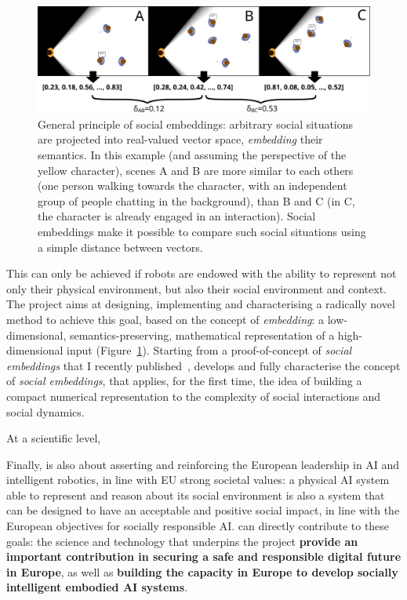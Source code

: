 \begin{figure}[H]
    \centering
    \includegraphics[width=0.9\linewidth]{figs/social-embeddings}
    \caption{General principle of social embeddings: arbitrary social situations
    are projected into real-valued vector space, \emph{embedding} their
    semantics. In this example (and assuming the perspective of the yellow
    character), scenes A and B  are more similar to each others (one person walking towards the
    character, with an independent group of people chatting in the background),
    than B and C (in C, the character is already engaged in an interaction).
    Social embeddings make it possible to compare such social situations using
    a simple distance between vectors.}
    \label{fig:social-embeddings}
\end{figure}

This can only be achieved if robots are endowed with the ability to represent
not only their physical environment, but also their social environment and
context. The \project project aims at designing, implementing and characterising
a radically novel method to achieve this goal, based on the concept of
\emph{embedding}: a low-dimensional, semantics-preserving, mathematical
representation of a high-dimensional input (Figure~\ref{fig:social-embeddings}).
Starting from a proof-of-concept of \emph{social embeddings} that I recently
published~\cite{lemaignan2024social}, \project develops and fully characterise
the concept of \emph{social embeddings}, that applies, for the first time, the
idea of building a compact numerical representation to the complexity of social
interactions and social dynamics.


At a scientific level, 

Finally, \project is also about asserting and reinforcing the European
leadership in AI and intelligent robotics, in line with EU strong societal
values: a physical AI system able to represent and reason about its social
environment is also a system that can be designed to have an acceptable and
positive social impact, in line with the European objectives for socially
responsible AI. \project can directly contribute to these goals: the science and
technology that underpins the project \textbf{provide an important contribution
in securing a safe and responsible digital future in Europe}, as well as
\textbf{\project building the capacity in Europe to develop socially intelligent
embodied AI systems}. 


